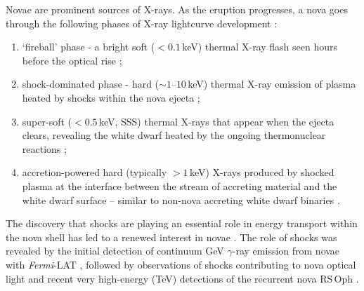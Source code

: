 \documentclass[a4paper,fleqn,usenatbib]{mnras}
\newcommand{\fermilat}{\emph{Fermi}-LAT}
\begin{document}
Novae are prominent sources of X-rays. As the eruption progresses, a nova goes 
through the following phases of X-ray lightcurve development \citep{2017PASP..129f2001M,2010AN....331..169H}:
\begin{enumerate}
\item `fireball' phase - a bright soft ($<0.1$\,keV) thermal X-ray flash seen hours before the
optical rise \citep{2022Natur.605..248K,2022ApJ...935L..15K};
\item shock-dominated phase - hard ($\sim1$--$10$\,keV) thermal X-ray emission of plasma 
heated by shocks within the nova ejecta
\citep{1994MNRAS.271..155O,2014MNRAS.442..713M,2014ASPC..490..327M,2020ApJ...895...80O,2021ApJ...910..134G};
\item super-soft ($<0.5$\,keV, SSS) thermal X-rays that
appear when the ejecta clears, revealing the white dwarf heated by 
the ongoing thermonuclear reactions
\citep{2011ApJS..197...31S,2013A&A...559A..50N,2018ApJ...862..164O}; 
\item accretion-powered hard (typically $>1$\,keV) X-rays produced by
shocked plasma at the interface between the stream of accreting material and the white dwarf surface --
similar to non-nova accreting white dwarf binaries
\citep{2020AdSpR..66.1097B,2020AdSpR..66.1209D,2020MNRAS.499.3006S}.
\end{enumerate}

The discovery that shocks are playing an essential role in energy transport within the nova shell has led to 
a renewed interest in novae \citep[for a recent review see][]{2021ARA&A..59..391C}.
The role of shocks was revealed by the initial detection of continuum GeV $\gamma$-ray emission from novae with
\fermilat{} \citep{2010Sci...329..817A,2014Sci...345..554A}, 
followed by observations of shocks contributing to nova optical light  
\citep{2017NatAs...1..697L,2020NatAs...4..776A} 
and recent very high-energy (TeV) detections of the recurrent nova RS\,Oph
\citep{2022NatAs...6..689A,2022Sci...376...77A,2022ApJ...935...44C}.
\end{document}
